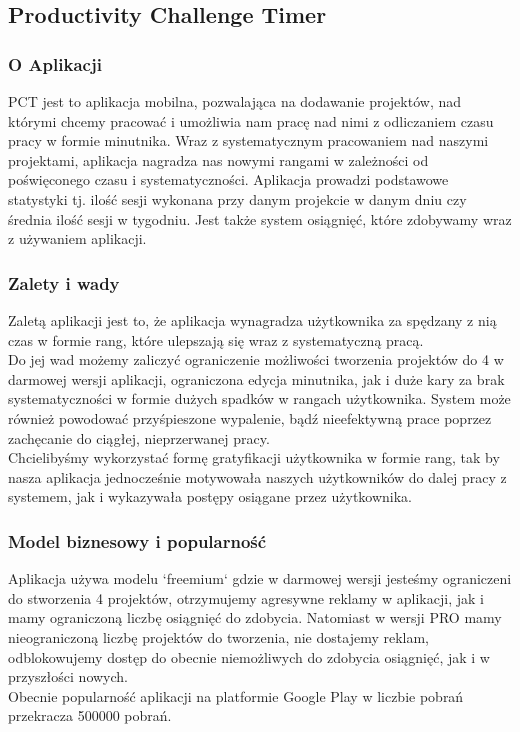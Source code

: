 \documentclass[a4paper,11pt]{report}
\begin{document}
\subsection{Productivity Challenge Timer}
\subsubsection{O Aplikacji}
PCT jest to aplikacja mobilna, pozwalająca na dodawanie projektów,
 nad którymi chcemy pracować i umożliwia nam pracę nad nimi z odliczaniem czasu pracy w formie minutnika.
 Wraz z systematycznym pracowaniem nad naszymi projektami,
 aplikacja nagradza nas nowymi rangami w zależności od poświęconego czasu i systematyczności.
 Aplikacja prowadzi podstawowe statystyki tj. ilość sesji wykonana przy danym projekcie w danym dniu
 czy średnia ilość sesji w tygodniu. Jest także system osiągnięć, które zdobywamy wraz z używaniem aplikacji.
\subsubsection{Zalety i wady}
Zaletą aplikacji jest to, że aplikacja wynagradza użytkownika za spędzany z nią czas w formie rang,
 które ulepszają się wraz z systematyczną pracą.
\vspace{0,5cm}
\\Do jej wad możemy zaliczyć ograniczenie możliwości tworzenia projektów do 4 w darmowej wersji aplikacji,
ograniczona edycja minutnika, jak i duże kary za brak systematyczności w formie dużych spadków w rangach użytkownika.
System może również powodować przyśpieszone wypalenie, bądź nieefektywną prace poprzez zachęcanie do ciągłej, nieprzerwanej pracy.
\vspace{0,5cm}
\\Chcielibyśmy wykorzystać formę gratyfikacji użytkownika w formie rang, tak by nasza aplikacja
 jednocześnie motywowała naszych użytkowników do dalej pracy z systemem, jak i
 wykazywała postępy osiągane przez użytkownika.
\subsubsection{Model biznesowy i popularność}
Aplikacja używa modelu `freemium` gdzie w darmowej wersji jesteśmy ograniczeni do stworzenia 4 projektów,
 otrzymujemy agresywne reklamy w aplikacji, jak i mamy ograniczoną liczbę osiągnięć do zdobycia.
 Natomiast w wersji PRO mamy nieograniczoną liczbę projektów do tworzenia, nie dostajemy reklam,
 odblokowujemy dostęp do obecnie niemożliwych do zdobycia osiągnięć, jak i w przyszłości nowych.
\vspace{0,5cm}\\
Obecnie popularność aplikacji na platformie Google Play w liczbie pobrań przekracza 500000 pobrań.
\end{document}
